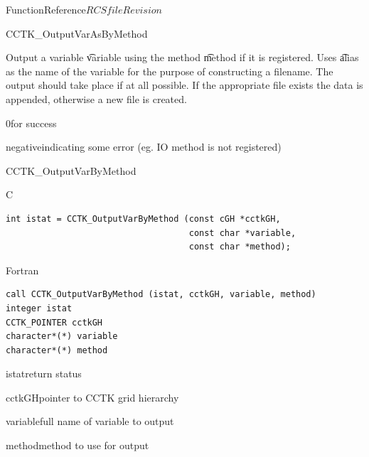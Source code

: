 \begin{cactuspart}{FunctionReference}{$RCSfile$}{$Revision$}
\begin{FunctionDescription}{CCTK\_OutputVarAsByMethod}
\begin{Discussion}
Output a variable {\t variable} using the method {\t method} if it is
registered. Uses {\t alias} as the name of the variable for the purpose
of constructing a filename. The output should take place if at all possible.
If the appropriate file exists the data is appended, otherwise a new
file is created.
\end{Discussion}

\begin{ErrorSection}
\begin{Error}{\rm 0}for success\end{Error}
\begin{Error}{negative}indicating some error (eg. IO method is not registered)\end{Error}
\end{ErrorSection}
\end{FunctionDescription}


\begin{FunctionDescription}{CCTK\_OutputVarByMethod}
\label{CCTK-OutputVarByMethod}
\begin{SynopsisSection}
\begin{Synopsis}{C}
\begin{verbatim}
int istat = CCTK_OutputVarByMethod (const cGH *cctkGH,
                                    const char *variable,
                                    const char *method);
\end{verbatim}
\end{Synopsis}
\begin{Synopsis}{Fortran}
\begin{verbatim}
call CCTK_OutputVarByMethod (istat, cctkGH, variable, method)
integer istat
CCTK_POINTER cctkGH
character*(*) variable
character*(*) method
\end{verbatim}
\end{Synopsis}
\end{SynopsisSection}

\begin{ParameterSection}
\begin{Parameter}{istat}return status\end{Parameter}
\begin{Parameter}{cctkGH}pointer to CCTK grid hierarchy\end{Parameter}
\begin{Parameter}{variable}full name of variable to output\end{Parameter}
\begin{Parameter}{method}method to use for output\end{Parameter}
\end{ParameterSection}


\end{FunctionDescription}
\end{cactuspart}
